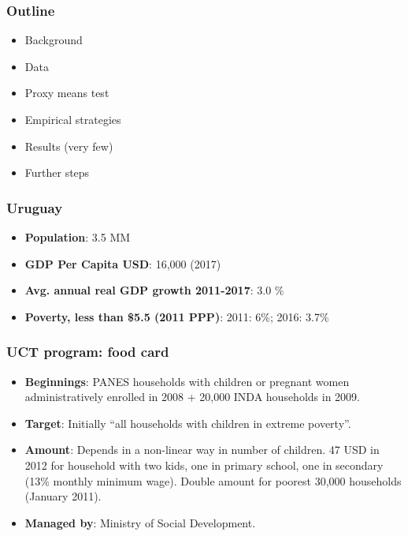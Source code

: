 \documentclass{beamer}
\begin{document}
\begin{frame}
\frametitle{Outline}
\begin{itemize}
	\item Background
	\item Data
	\item Proxy means test
	\item Empirical strategies
	\item Results (very few)
	\item Further steps
\end{itemize}
\end{frame}

\begin{frame}
\frametitle{Uruguay}
\begin{itemize}
	\item \textbf{Population}: 3.5 MM
	\item \textbf{GDP Per Capita USD}: 16,000 (2017)
	\item \textbf{Avg. annual real GDP growth 2011-2017}: 3.0 \%
	\item \textbf{Poverty, less than \$5.5 (2011 PPP)}: 2011: 6\%; 2016: 3.7\%	
\end{itemize}
\end{frame}

\begin{frame}
\frametitle{UCT program: food card}
\begin{itemize}
	\item \textbf{Beginnings}: PANES households with children or pregnant women administratively enrolled in 2008 + 20,000 INDA households in 2009.
	\item \textbf{Target}: Initially ``all households with children in extreme poverty''.
	\item \textbf{Amount}: Depends in a non-linear way in number of children. 47 USD in 2012 for household with two kids, one in primary school, one in secondary (13\% monthly minimum wage). Double amount for poorest 30,000 households (January 2011).
	\item \textbf{Managed by}: Ministry of Social Development.		
\end{itemize}
\end{frame}
	
\end{document}
